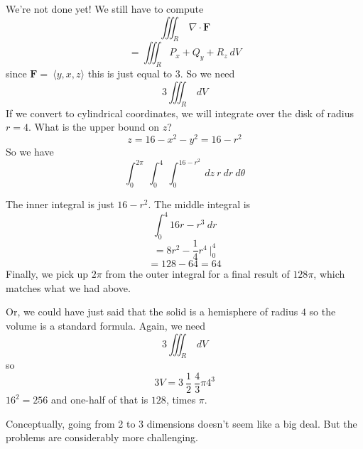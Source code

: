 \documentclass[11pt, oneside]{article}
\begin{document}
We're not done yet!  We still have to compute
\[ \iiint_R \ \nabla \cdot \mathbf{F} \]
\[ = \iiint_R P_x + Q_y + R_z \ dV \]
since $\mathbf{F} = \ \langle y,x,z \rangle$ this is just equal to $3$.  So we need 
\[ 3 \iiint_R  \ dV \]
If we convert to cylindrical coordinates, we will integrate over the disk of radius $r=4$.  What is the upper bound on $z$?
\[ z = 16 - x^2 - y^2 = 16 - r^2 \]
So we have
\[ \int_0^{2\pi} \ \int_0^4 \ \int_0^{16 - r^2} \ dz \ r \ dr \ d \theta \]

The inner integral is just $16 - r^2$.  The middle integral is
\[ \int_0^4 16r - r^3 \ dr \]
\[ = 8r^2 - \frac{1}{4}r^4 \ \bigg |_0^4 \]
\[ = 128 - 64 = 64 \]
Finally, we pick up $2 \pi$ from the outer integral for a final result of $128 \pi$, which matches what we had above.

Or, we could have just said that the solid is a hemisphere of radius $4$ so the volume is a standard formula.  Again, we need 
\[ 3 \iiint_R  \ dV \]
so
\[ 3 V = 3 \ \frac{1}{2} \ \frac{4}{3} \pi 4^3 \]
$16^2 = 256$ and one-half of that is $128$, times $\pi$.

Conceptually, going from 2 to 3 dimensions doesn't seem like a big deal.  But the problems are considerably more challenging.
\end{document}
